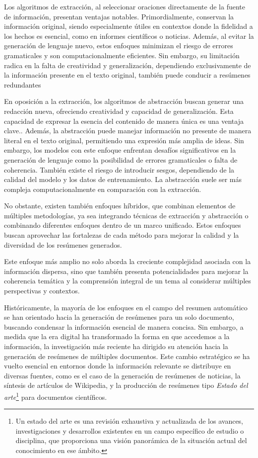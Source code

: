     Los algoritmos de extracción, al seleccionar oraciones directamente de la fuente de información, presentan ventajas notables. Primordialmente, conservan la información original, siendo especialmente útiles en contextos donde la fidelidad a los hechos es esencial, como en informes científicos o noticias. Además, al evitar la generación de lenguaje nuevo, estos enfoques minimizan el riesgo de errores gramaticales y son computacionalmente eficientes. Sin embargo, su limitación radica en la falta de creatividad y generalización, dependiendo exclusivamente de la información presente en el texto original, también puede conducir a resúmenes redundantes\cite{LexRank}

    En oposición a la extracción, los algoritmos de abstracción buscan generar una redacción nueva, ofreciendo creatividad y capacidad de generalización. Esta capacidad de expresar la esencia del contenido de manera única es una ventaja clave.\cite{rush2015neural}. Además, la abstracción puede manejar información no presente de manera literal en el texto original, permitiendo una expresión más amplia de ideas\cite{PaulusXS17}. Sin embargo, los modelos con este enfoque enfrentan desafíos significativos en la generación de lenguaje como la posibilidad de errores gramaticales o falta de coherencia. También existe el riesgo de introducir sesgos, dependiendo de la calidad del modelo y los datos de entrenamiento. La abstracción suele ser más compleja computacionalmente en comparación con la extracción.

    No obstante, existen también enfoques híbridos\cite{SeeLM17}, que combinan elementos de múltiples metodologías, ya sea integrando técnicas de extracción y abstracción o combinando diferentes enfoques dentro de un marco unificado. Estos enfoques buscan aprovechar las fortalezas de cada método para mejorar la calidad y la diversidad de los resúmenes generados.

    Este enfoque más amplio no solo aborda la creciente complejidad asociada con la información dispersa, sino que también presenta potencialidades para mejorar la coherencia temática y la comprensión integral de un tema al considerar múltiples perspectivas y contextos.

    Históricamente, la mayoría de los enfoques en el campo del resumen automático se han orientado hacia la generación de resúmenes para un solo documento, buscando condensar la información esencial de manera concisa. Sin embargo, a medida que la era digital ha transformado la forma en que accedemos a la información, la investigación más reciente ha dirigido su atención hacia la generación de resúmenes de múltiples documentos. Este cambio estratégico se ha vuelto esencial en entornos donde la información relevante se distribuye en diversas fuentes, como es el caso de la generación de resúmenes de noticias\cite{fabbri2019multi-news}, la síntesis de artículos de Wikipedia\cite{liu2018}, y la producción de resúmenes tipo \emph{Estado del arte}\footnote{Un estado del arte es una revisión exhaustiva y actualizada de los avances, investigaciones y desarrollos existentes en un campo específico de estudio o disciplina, que proporciona una visión panorámica de la situación actual del conocimiento en ese ámbito. } para documentos científicos\cite{lu2020multixscience}.

